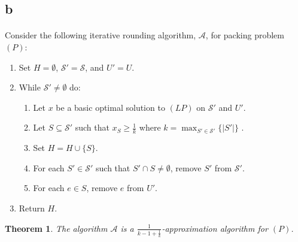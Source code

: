\documentclass[letterpaper,12pt,oneside,onecolumn]{article}
\newcommand{\cA}{\mathcal{A}} \newcommand{\cB}{\mathcal{B}}
\newcommand{\cS}{\mathcal{S}} \newcommand{\cT}{\mathcal{T}}
\newtheorem{theorem}[fact]{Theorem}
\begin{document}
\subsection*{b}
\paragraph{}
Consider the following iterative rounding algorithm, $\cA$, for packing problem $(P)$:
\begin{enumerate}
\item Set $H = \emptyset$, $\cS' = \cS$, and $U' = U$.
\item While $\cS' \neq \emptyset$ do:
	\begin{enumerate}
	\item Let $x$ be a basic optimal solution to $(LP)$ on $\cS'$ and $U'$.
	\item Let $S \subseteq \cS'$ such that $x_S \geq \frac{1}{k}$ where $k = \max_{S' \in \cS'}\{|S'|\}$ .
	\item Set $H = H \cup \{S\}$.
	\item For each $S' \in \cS'$ such that $S' \cap S \neq \emptyset$, remove $S'$ from $\cS'$.
	\item For each $e \in S$, remove $e$ from $U'$. 
	\end{enumerate}
\item Return $H$.
\end{enumerate}
\begin{theorem}
The algorithm $\cA$ is a $\frac{1}{k-1+\frac{1}{k}}$-approximation algorithm for $(P)$.
\end{theorem}
\end{document}

